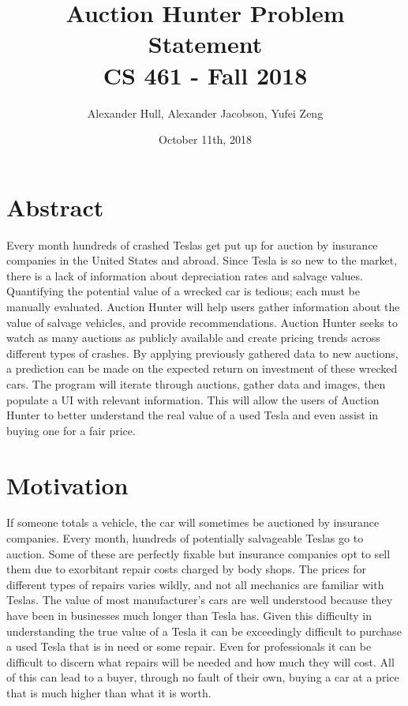 \documentclass[draftclsnofoot,onecolumn,10pt]{IEEEtran}
\title{Auction Hunter Problem Statement\\CS 461 - Fall 2018}
\author{Alexander Hull, Alexander Jacobson, Yufei Zeng}
\date{October 11th, 2018}
\begin{document}
\maketitle

\singlespacing

\section{Abstract}

Every month hundreds of crashed Teslas get put up for auction by insurance companies in the United States and abroad. Since Tesla is so new to the market, there is a lack of information about depreciation rates and salvage values. Quantifying the potential value of a wrecked car is tedious; each must be manually evaluated. Auction Hunter will help users gather information about the value of salvage vehicles, and provide recommendations. Auction Hunter seeks to watch as many auctions as publicly available and create pricing trends across different types of crashes. By applying previously gathered data to new auctions, a prediction can be made on the expected return on investment of these wrecked cars. The program will iterate through auctions, gather data and images, then populate a UI with relevant information. This will allow the users of Auction Hunter to better understand the real value of a used Tesla and even assist in buying one for a fair price.

\newpage



\section{Motivation}
If someone totals a vehicle, the car will sometimes be auctioned by insurance companies. Every month, hundreds of potentially salvageable Teslas go to auction. Some of these are perfectly fixable but insurance companies opt to sell them due to exorbitant repair costs charged by body shops. The prices for different types of repairs varies wildly, and not all mechanics are familiar with Teslas. The value of most manufacturer's cars are well understood because they have been in businesses much longer than Tesla has. Given this difficulty in understanding the true value of a Tesla it can be exceedingly difficult to purchase a used Tesla that is in need or some repair. Even for professionals it can be difficult to discern what repairs will be needed and how much they will cost. All of this can lead to a buyer, through no fault of their own, buying a car at a price that is much higher than what it is worth.
\end{document}
